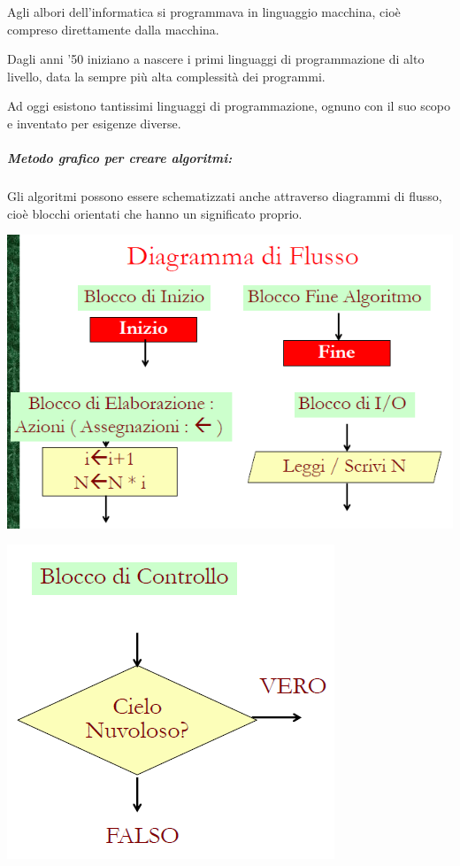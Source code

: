 \documentclass[
  paper=a4,
  oneside  ,captions=tableheading
]{scrbook}
\begin{document}
Agli albori dell'informatica si programmava in linguaggio macchina, cioè
compreso direttamente dalla macchina.

Dagli anni '50 iniziano a nascere i primi linguaggi di programmazione di
alto livello, data la sempre più alta complessità dei programmi.

Ad oggi esistono tantissimi linguaggi di programmazione, ognuno con il
suo scopo e inventato per esigenze diverse.

\hypertarget{metodo-grafico-per-creare-algoritmi}{%
\subparagraph{Metodo grafico per creare
algoritmi:}\label{metodo-grafico-per-creare-algoritmi}}

Gli algoritmi possono essere schematizzati anche attraverso diagrammi di
flusso, cioè blocchi orientati che hanno un significato proprio.

\includegraphics{./image/image-20201111002115408.png}

\includegraphics{./image/image-20201111002130617.png}
\end{document}
